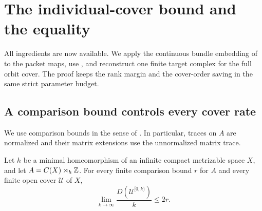 \section{The individual-cover bound and the equality}
\label{sec:lower-bound}

All ingredients are now available. We apply the continuous bundle
embedding of  to the packet maps, use
, and reconstruct one finite target complex
for the full orbit cover. The proof keeps the rank margin and the
cover-order saving in the same strict parameter budget.

\subsection{A comparison bound controls every cover rate}

We use comparison bounds in the sense of
.  In particular, traces on $A$ are
normalized and their matrix extensions use the unnormalized
matrix trace.

\begin{theorem}
\label{thm:cover-bound}
Let $h$ be a minimal homeomorphism of an infinite compact
metrizable space $X$, and let $A=C(X)\rtimes_h\mathbb Z$.
For every finite comparison bound $r$ for $A$ and every finite
open cover $\mathcal U$ of $X$,
\[
 \lim_{k\to\infty}\frac{D(\mathcal U^{[0,k)})}{k}\le2r.
\]
\end{theorem}

